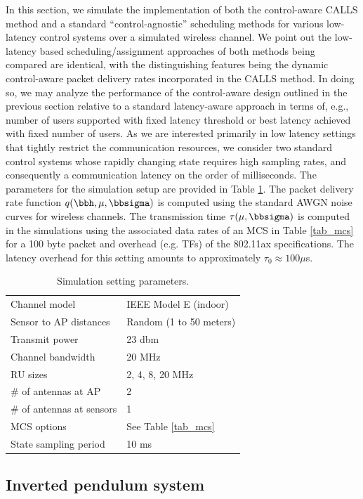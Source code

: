 In this section, we simulate the implementation of both the control-aware CALLS method and a standard ``control-agnostic'' scheduling methods for various low-latency control systems over a simulated wireless channel. We point out the low-latency based scheduling/assignment approaches of both methods being compared are identical, with the distinguishing features being the dynamic control-aware packet delivery rates incorporated in the CALLS method. In doing so, we may analyze the performance of the control-aware design outlined in the previous section relative to a standard latency-aware approach in terms of, e.g., number of users supported with fixed latency threshold or best latency achieved with fixed number of users. As we are interested primarily in low latency settings that tightly restrict the communication resources, we consider two standard control systems whose rapidly changing state requires high sampling rates, and consequently a communication latency on the order of milliseconds. The parameters for the simulation setup are provided in Table \ref{tab_simulation}. The packet delivery rate function $q(\bbh,\mu,\bbsigma)$ is computed using the standard AWGN noise curves for wireless channels. The transmission time $\tau(\mu,\bbsigma)$ is computed in the simulations using the associated data rates of an MCS in Table \ref{tab_mcs} for a 100 byte packet and overhead (e.g. TFs) of the 802.11ax specifications. The latency overhead for this setting amounts to approximately $\tau_0 \approx 100 \mu$s.
%
\begin{table}
\begin{tabular}{ l | l } \hline
  Channel model & IEEE Model E (indoor) \cite{liu2014ieee} \\
  Sensor to AP distances & Random (1 to 50 meters)\\
  Transmit power & 23 dbm \\
  Channel bandwidth & 20 MHz \\
  RU sizes & 2, 4, 8, 20 MHz \\
  \# of antennas at AP & 2 \\
  \# of antennas at sensors & 1 \\
  MCS options & See Table \ref{tab_mcs} \\
  State sampling period & 10 ms \\
  \hline
\end{tabular}
\caption{Simulation setting parameters.}
\label{tab_simulation}
\end{table}
%

\subsection{Inverted pendulum system}

